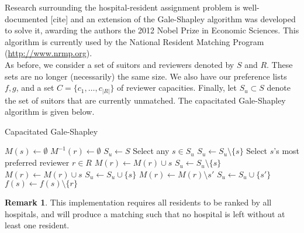 \documentclass{article}
\theoremstyle{definition}
\newtheorem*{remark}{Remark}
\begin{document}
Research surrounding the hospital-resident assignment problem is well-documented 
[cite] and an extension of the Gale-Shapley algorithm was developed to solve it,
awarding the authors the 2012 Nobel Prize in Economic Sciences. This algorithm
is currently used by the National Resident Matching Program 
(\url{http://www.nrmp.org}). \\

As before, we consider a set of suitors and reviewers denoted by $S$ and $R$. 
These sets are no longer (necessarily) the same size. We also have our 
preference lists $f, g$, and a set $C = \{ c_1, \ldots, c_{|R|} \}$ of reviewer
capacities. Finally, let $S_u \subset S$ denote the set of suitors that are 
currently unmatched. The capacitated Gale-Shapley algorithm is given below.

\begin{algorithm}[H]
\caption{Capacitated Gale-Shapley}\label{alg:cap-galeshapley}
    \begin{algorithmic}[0]
	        \State $M(s) \gets \emptyset$
	    \EndFor
	        \State $M^{-1}(r) \gets \emptyset$
	    \EndFor
	    \State $S_u \gets S$
	        \State Select any $s \in S_u$
		        \State $S_u \gets S_u \setminus \{s\}$
		    \Else
		        \State Select $s$'s most preferred reviewer $r \in R$
			        \State $M(r) \gets M(r) \cup s$
			        \State $S_u \gets S_u \setminus \{s\}$
		        \Else
				                \State $M(r) \gets M(r) \cup s$
				                \State $S_u \gets S_u \cup \{s\}$
				                \State $M(r) \gets M(r) \setminus s'$
				                \State $S_u \gets S_u \cup \{s'\}$
				            \Else
				                \State $f(s) \gets f(s) \setminus \{r\}$
				            \EndIf
			            \EndIf
			        \EndFor
		        \EndIf
		    \EndIf
	    \EndWhile
	\end{algorithmic}
\end{algorithm}

\begin{remark}
	This implementation requires all residents to be ranked by all hospitals, 
    and will produce a matching such that no hospital is left without at least 
    one resident.
\end{remark}
\end{document}
